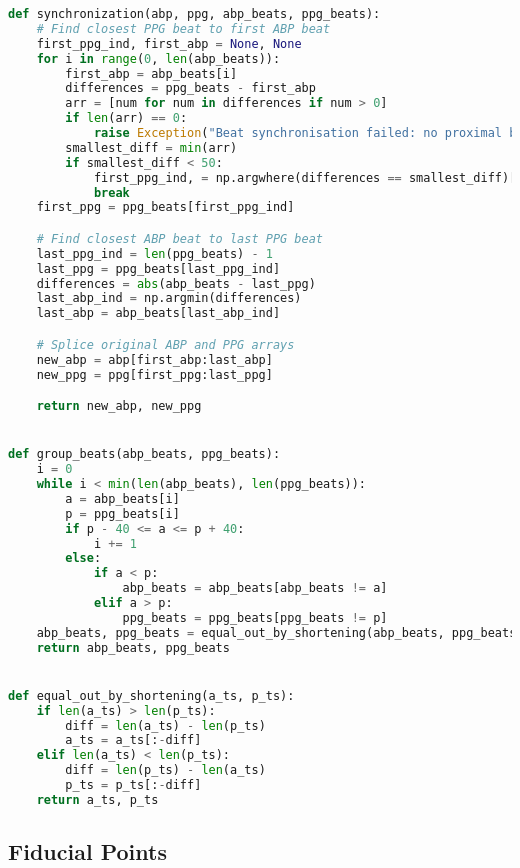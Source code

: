 \begin{lstlisting}[language=Python,label={lst:sp.py}, basicstyle=\scriptsize]
def synchronization(abp, ppg, abp_beats, ppg_beats):
    # Find closest PPG beat to first ABP beat
    first_ppg_ind, first_abp = None, None
    for i in range(0, len(abp_beats)):
        first_abp = abp_beats[i]
        differences = ppg_beats - first_abp
        arr = [num for num in differences if num > 0]
        if len(arr) == 0:
            raise Exception("Beat synchronisation failed: no proximal beats found")
        smallest_diff = min(arr)
        if smallest_diff < 50:
            first_ppg_ind, = np.argwhere(differences == smallest_diff)[0]
            break
    first_ppg = ppg_beats[first_ppg_ind]

    # Find closest ABP beat to last PPG beat
    last_ppg_ind = len(ppg_beats) - 1
    last_ppg = ppg_beats[last_ppg_ind]
    differences = abs(abp_beats - last_ppg)
    last_abp_ind = np.argmin(differences)
    last_abp = abp_beats[last_abp_ind]

    # Splice original ABP and PPG arrays
    new_abp = abp[first_abp:last_abp]
    new_ppg = ppg[first_ppg:last_ppg]

    return new_abp, new_ppg


def group_beats(abp_beats, ppg_beats):
    i = 0
    while i < min(len(abp_beats), len(ppg_beats)):
        a = abp_beats[i]
        p = ppg_beats[i]
        if p - 40 <= a <= p + 40:
            i += 1
        else:
            if a < p:
                abp_beats = abp_beats[abp_beats != a]
            elif a > p:
                ppg_beats = ppg_beats[ppg_beats != p]
    abp_beats, ppg_beats = equal_out_by_shortening(abp_beats, ppg_beats)
    return abp_beats, ppg_beats


def equal_out_by_shortening(a_ts, p_ts):
    if len(a_ts) > len(p_ts):
        diff = len(a_ts) - len(p_ts)
        a_ts = a_ts[:-diff]
    elif len(a_ts) < len(p_ts):
        diff = len(p_ts) - len(a_ts)
        p_ts = p_ts[:-diff]
    return a_ts, p_ts
\end{lstlisting}

\subsection{Fiducial Points}
\label{subsec:code_fidp}

